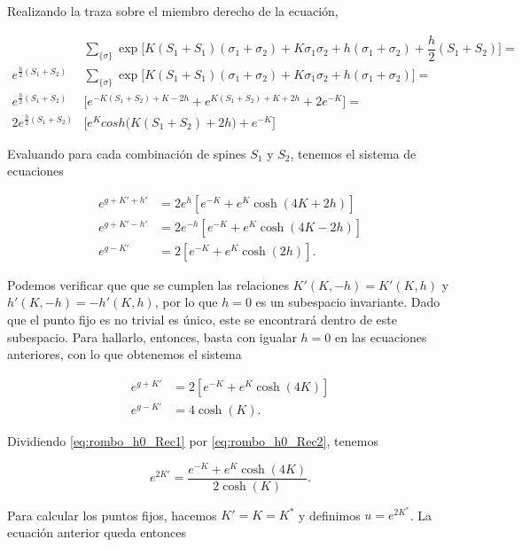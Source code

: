 \documentclass[10pt]{article}
\begin{document}
Realizando la traza sobre el miembro derecho de la ecuaci\'on,

\begin{align*}
&\sum_{\lbrace \sigma \rbrace} \exp \bigg[ K(S_1 + S_1) (\sigma_1 + \sigma_2) + K \sigma_1 \sigma_2 + h (\sigma_1 + \sigma_2) + \dfrac{h}{2} (S_1 + S_2) \bigg] = \\
e^{\frac{h}{2} (S_1 + S_2)}  &\sum_{\lbrace \sigma \rbrace} \exp \bigg[ K(S_1 + S_1) (\sigma_1 + \sigma_2) + K \sigma_1 \sigma_2 + h (\sigma_1 + \sigma_2) \bigg] = \\
e^{\frac{h}{2} (S_1 + S_2)} &\bigg[ e^{-K(S_1+S_2)+K-2h} + e^{K(S_1+S_2)+K+2h} + 2e^{-K} \bigg] = \\
2 e^{\frac{h}{2} (S_1 + S_2)}  &\bigg[ e^{K} cosh\bigg( K(S_1+S_2) + 2h \bigg) + e^{-K}\bigg]
\end{align*}

Evaluando para cada combinaci\'on de spines $S_1$ y $S_2$, tenemos el sistema de ecuaciones

\begin{align}
e^{g+K'+h'} &= 2e^{h}\left[e^{-K} + e^K\cosh(4K+2h) \right] \label{eq:rombo_Rec1}\\
e^{g+K'-h'} &= 2e^{-h}\left[e^{-K} + e^K\cosh(4K-2h) \right]\label{eq:rombo_Rec2} \\
e^{g-K'} &= 2\left[ e^{-K} + e^K \cosh(2h) \right]. \label{eq:rombo_Rec3}
\end{align}

Podemos verificar que que se cumplen las relaciones $K'(K, -h) = K'(K, h)$ y $h'(K, -h) = -h'(K, h)$, por lo que $h=0$ es un subespacio invariante. Dado que el punto fijo es no trivial es \'unico, este se encontrar\'a dentro de este subespacio. Para hallarlo, entonces, basta con igualar $h = 0$ en las ecuaciones anteriores, con lo que obtenemos el sistema

\begin{align}
e^{g+K'} &= 2\left[e^{-K} + e^K\cosh(4K) \right] \label{eq:rombo_h0_Rec1}\\
e^{g-K'} &= 4\cosh(K). \label{eq:rombo_h0_Rec2}
\end{align}

Dividiendo  \ref{eq:rombo_h0_Rec1} por \ref{eq:rombo_h0_Rec2}, tenemos

\begin{equation} \label{eq:rombo_Rk}
e^{2K'} = \dfrac{e^{-K} + e^K\cosh(4K)}{2\cosh(K)}.
\end{equation}

Para calcular los puntos fijos, hacemos $K'=K=K^*$ y definimos $u=e^{2K^*}$. La ecuaci\'on anterior queda entonces 
\end{document}
